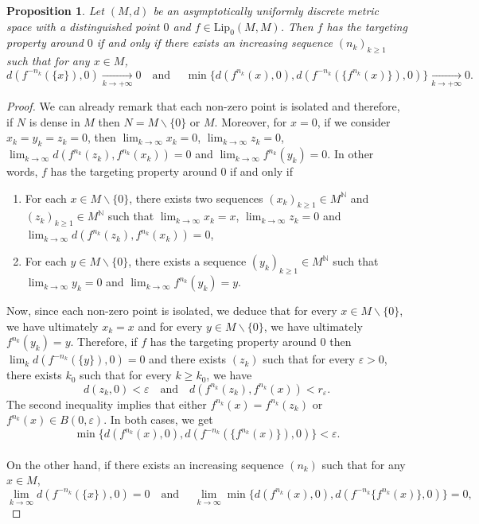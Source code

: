 \documentclass[12pt,english]{amsart}
\numberwithin{equation}{section}
\theoremstyle{plain}
\newtheorem{proposition}[theorem]{Proposition}
\theoremstyle{definition}
\newcommand{\N}{\mathbb{N}}
\begin{document}
\begin{proposition}
Let $(M,d)$ be an asymptotically uniformly discrete metric space with a distinguished point $0$ and $f\in \text{Lip}_0(M,M)$. Then $f$ has the targeting property around $0$ if and only if there exists an increasing sequence $(n_k)_{k\geq1}$ such that for any $x\in M$,
\[ d(f^{-n_k}(\{x\}),0) \xrightarrow[k\to +\infty]{} 0
\quad \text{and }\quad \min\{d(f^{n_k}(x),0), d(f^{-n_k}(\{f^{n_k}(x)\}),0)\}\xrightarrow[k\to +\infty]{} 0.\]
\end{proposition}
\begin{proof}
We can already remark that each non-zero point is isolated and therefore, if $N$ is dense in $M$ then $N=M\backslash \{0\}$ or $M$. Moreover, for $x=0$, if we consider $x_k=y_k=z_k=0$, then $\lim_{k\to\infty} x_k=0$,
$\lim_{k\to\infty} z_k=0$, $\lim_{k\to\infty} d(f^{n_k}(z_k),f^{n_k}(x_k))=0$ and  $\lim_{k\to\infty} f^{n_k}(y_k)=0$. In other words, $f$ has the targeting property around $0$ if and only if
\begin{enumerate}
\item[(i)] For each $x\in M\backslash \{0\}$, there exists two sequences $(x_k)_{k\geq1}\in M^{\N}$ and $(z_k)_{k\geq1}\in M^{\N}$ such that $\lim_{k\to\infty} x_k=x$, $\lim_{k\to\infty} z_k=0$ and $\lim_{k\to\infty} d(f^{n_k}(z_k),f^{n_k}(x_k))=0$, 
\item[(ii)] For each $y\in M\backslash \{0\}$, there exists a sequence $(y_k)_{k\geq1}\in M^\N$ such that $\lim_{k\to\infty} y_k=0$ and $\lim_{k\to\infty} f^{n_k}(y_k)=y$. 
\end{enumerate}
Now, since each non-zero point is isolated, we deduce that for every $x\in M\backslash \{0\}$, we have ultimately $x_k=x$ and for every $y\in M\backslash \{0\}$, we have ultimately $f^{n_k}(y_k)=y$.
Therefore, if $f$ has the targeting property around $0$ then 
$\lim_k d(f^{-n_k}(\{y\}),0)=0$ and there exists $(z_k)$ such that for every $\varepsilon>0$, there exists $k_0$ such that for every $k\ge k_0$, we have
\[d(z_k,0)<\varepsilon \quad \text{and}\quad d(f^{n_k}(z_k),f^{n_k}(x))<r_{\varepsilon}.\]
The second inequality implies that either $f^{n_k}(x)=f^{n_k}(z_k)$ or $f^{n_k}(x)\in B(0,\varepsilon)$. In both cases, we get 
\[\min\{d(f^{n_k}(x),0), d(f^{-n_k}(\{f^{n_k}(x)\}),0)\}<\varepsilon.\]
\text{}\\
On the other hand, if there exists an increasing sequence $(n_k)$ such that for any $x\in M$,
\[\lim_{k\to\infty} d(f^{-n_k}(\{x\}),0)=0
\quad \text{and }\quad \lim_{k\to\infty} \min\{d(f^{n_k}(x),0), d(f^{-n_k}\{f^{n_k}(x)\},0)\}=0,\]

\end{proof}
\end{document}
